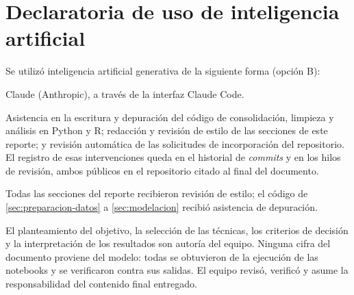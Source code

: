 \section{Declaratoria de uso de inteligencia artificial}
\label{sec:declaratoria-ia}

Se utilizó inteligencia artificial generativa de la siguiente forma
(opción B):

\begin{description}[leftmargin=0pt, labelindent=0pt, style=nextline]
  \item[Herramienta] Claude (Anthropic), a través de la interfaz Claude Code.
  \item[Uso realizado] Asistencia en la escritura y depuración del código de
    consolidación, limpieza y análisis en Python y R; redacción y revisión
    de estilo de las secciones de este reporte; y revisión automática de
    las solicitudes de incorporación del repositorio. El registro de esas
    intervenciones queda en el historial de \emph{commits} y en los hilos de
    revisión, ambos públicos en el repositorio citado al final del
    documento.
  \item[Secciones donde se utilizó] Todas las secciones del reporte
    recibieron revisión de estilo; el código de \cref{sec:preparacion-datos}
    a \cref{sec:modelacion} recibió asistencia de depuración.
  \item[Validación realizada por los estudiantes] El planteamiento del
    objetivo, la selección de las técnicas, los criterios de decisión y la
    interpretación de los resultados son autoría del equipo. Ninguna cifra
    del documento proviene del modelo: todas se obtuvieron de la ejecución
    de las notebooks y se verificaron contra sus salidas. El equipo revisó,
    verificó y asume la responsabilidad del contenido final entregado.
\end{description}
